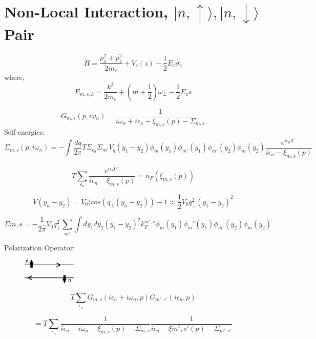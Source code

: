 \section{Non-Local Interaction, $|n,\uparrow\rangle, |n,\downarrow\rangle$ Pair}

\begin{equation}
	H=\frac{p_x^2+p_z^2}{2m_e}+V_c(z)-\frac{1}{2}E_z\sigma_z
\end{equation}
\newline
where,
\begin{equation}
	E_{m,s,k}=\frac{k^2}{2m_e}+(m+\frac{1}{2})\omega_{\perp}-\frac{1}{2}E_zs
\end{equation}

\begin{equation}
G_{m,s}(p,i\omega_n)=\frac{1}{i\omega_n+i\epsilon_n-\xi_{m,s}(p)-\Sigma_{m,s}}
\end{equation}
\newline
Self energies:
\begin{equation}
	\Sigma_{m,s}(p,i\omega_n)=-\int\frac{dq}{2\pi}T\Sigma_{\epsilon_n}\Sigma_{m'}V_q(y_1-y_2)\phi_m(y_1)\phi_{m'}(y_1)\phi_{m'}(y_2)\phi_m(y_2)\frac{e^{i\epsilon_n0^+}}{i\epsilon_n-\xi_{m,s}(p)}
\end{equation}

\[T\sum\limits_{\epsilon_n}\frac{e^{i\epsilon_n0^+}}{i\epsilon_n-\xi_{m,s}(p)}=n_F(\xi_{m,s}(p))\]

\[V(y_a-y_2)=V_0(cos(q_\perp(y_a-y_2))-1\approx\frac{1}{2}V_0q_\perp^2(y_1-y_2)^2\]

\begin{equation}
	\Sigma{m,s}=-\frac{1}{2\pi}V_0 q_\perp^2\sum\limits_{m'}\int{dy_1dy_2}{(y_1-y_2)^2k_F^{m',s}\phi_m(y_1)\phi_m'(y_1)\phi_{m'}(y_2)\phi_m(y_2)}
\end{equation}


Polarization Operator:
\begin{figure}[h]
\begin{center}
	\includegraphics[width=1in]{apfig1}
\end{center}
\end{figure}
\[T\sum\limits_{\epsilon_n}G_{m,s}(i\epsilon_n+i\omega_n,p)G_{m',s'}(i\epsilon_n,p)\]

\[= T\sum\limits_{\epsilon_n} \frac{1}{i\epsilon_n+i\omega_n-\xi_{m,s}(p)-\Sigma_{m,s}} \frac{1}{i\epsilon_n-\xi{m',s'}(p)-\Sigma_{m',s'}}\]

